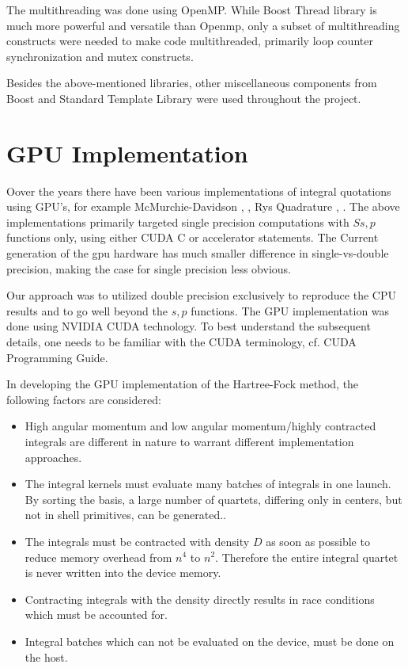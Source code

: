 \documentclass[12pt]{article}
\begin{document}
The multithreading was done using OpenMP.  While Boost Thread library
is much more powerful and versatile than Openmp, only a subset of
multithreading constructs were needed to make code multithreaded,
primarily loop counter synchronization and mutex constructs.

Besides the above-mentioned libraries, other miscellaneous components
from Boost and Standard Template Library were used throughout the project.  



\section*{GPU Implementation}

Oover the years there have been various implementations of integral
quotations using GPU's, for example McMurchie-Davidson
\cite{ufimtsev2008quantum}, \cite{ufimtsev2009quantum}, Rys Quadrature
\cite{yasuda2008two}, \cite{wilkinson_acceleration_2011}.  The above
implementations primarily targeted single precision computations with
$Ss,p$ functions only, using either CUDA C or accelerator statements.
The Current generation of the gpu hardware has much smaller difference
in single-vs-double precision, making the case for single precision
less obvious.  

Our approach was to utilized double precision
exclusively to reproduce the CPU results and to go well beyond the $s,
p$ functions. The GPU implementation was done using NVIDIA CUDA technology.
To best understand the subsequent details, one needs to be
familiar with the CUDA terminology, cf. CUDA Programming Guide.

In developing the GPU implementation of the Hartree-Fock method, the
 following factors are considered:
\begin{itemize}
\item High angular momentum and low angular momentum/highly
  contracted integrals are different in nature to warrant different
  implementation approaches.
\item The integral kernels must evaluate many batches of integrals
  in one launch.  By sorting the basis, a large number
  of quartets, differing only in centers, but not in shell primitives,
  can be generated..
\item The integrals must be contracted with density $D$ as soon as
  possible to reduce memory overhead from $n^4$ to $n^2$.  Therefore
  the entire integral quartet is never written into the device memory.
\item Contracting integrals with the density directly results in
  race conditions which must be accounted for.
\item Integral batches which can not be evaluated on the device, must
  be done on the host.
\end{itemize}
\end{document}
